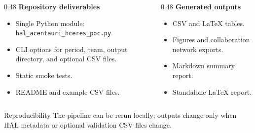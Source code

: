 \begin{frame}[t]

  \begin{columns}[T,onlytextwidth]
    \begin{column}{0.48\textwidth}
      \textbf{Repository deliverables}
      \begin{itemize}
        \item Single Python module: \texttt{hal\_acentauri\_hceres\_poc.py}.
        \item CLI options for period, team, output directory, and optional CSV files.
        \item Static smoke tests.
        \item README and example CSV files.
      \end{itemize}
    \end{column}

    \begin{column}{0.48\textwidth}
      \textbf{Generated outputs}
      \begin{itemize}
        \item CSV and LaTeX tables.
        \item Figures and collaboration network exports.
        \item Markdown summary report.
        \item Standalone LaTeX report.
      \end{itemize}
    \end{column}
  \end{columns}

  \vspace{0.35cm}

  \begin{block}{Reproducibility}
    The pipeline can be rerun locally; outputs change only when HAL metadata or optional validation CSV files change.
  \end{block}
\end{frame}

